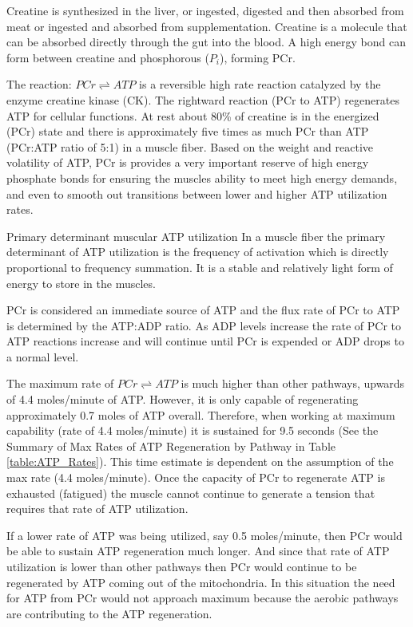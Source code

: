Creatine is synthesized in the liver, or ingested, digested and then absorbed from meat or ingested and absorbed from supplementation. Creatine is a molecule that can be absorbed directly through the gut into the blood. A high energy bond can form between creatine and phosphorous ($P_i$), forming PCr.

The reaction: $PCr \rightleftharpoons ATP$ is a reversible high rate reaction catalyzed by the enzyme creatine kinase (CK). The rightward reaction (PCr to ATP) regenerates ATP for cellular functions. At rest about 80\% of creatine is in the energized (PCr) state and there is approximately five times as much PCr than ATP (PCr:ATP ratio of 5:1) in a muscle fiber. Based on the weight and reactive volatility of ATP, PCr is provides a very important reserve of high energy phosphate bonds for ensuring the muscles ability to meet high energy demands, and even to smooth out transitions between lower and higher ATP utilization rates.

\begin{backgroundinformation}{Primary determinant muscular ATP utilization}
    In a muscle fiber the primary determinant of ATP utilization is the frequency of activation which is directly proportional to frequency summation. It is a stable and relatively light form of energy to store in the muscles.
\end{backgroundinformation}

PCr is considered an immediate source of ATP and the flux rate of PCr to ATP is determined by the ATP:ADP ratio. As ADP levels increase the rate of PCr to ATP reactions increase and will continue until PCr is expended or ADP drops to a normal level.

The maximum rate of $PCr \rightleftharpoons ATP$ is much higher than other pathways, upwards of 4.4 moles/minute of ATP. However, it is only capable of regenerating approximately 0.7 moles of ATP overall. Therefore, when working at maximum capability (rate of 4.4 moles/minute) it is sustained for 9.5 seconds (See the Summary of Max Rates of ATP Regeneration by Pathway in Table \ref{table:ATP_Rates}). This time estimate is dependent on the assumption of the max rate (4.4 moles/minute). Once the capacity of PCr to regenerate ATP is exhausted (fatigued) the muscle cannot continue to generate a tension that requires that rate of ATP utilization.

If a lower rate of ATP was being utilized, say 0.5 moles/minute, then PCr would be able to sustain ATP regeneration much longer. And since that rate of ATP utilization is lower than other pathways then PCr would continue to be regenerated by ATP coming out of the mitochondria. In this situation the need for ATP from PCr would not approach maximum because the aerobic pathways are contributing to the ATP regeneration.

